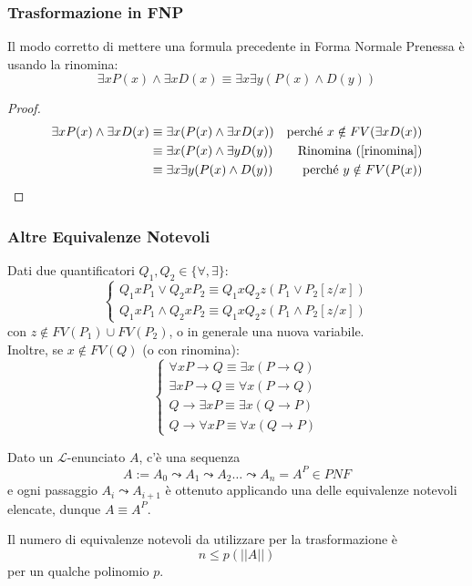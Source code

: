 \subsubsection{Trasformazione in FNP}
Il modo corretto di mettere una formula precedente in Forma Normale Prenessa è usando la rinomina:
$$
\exists x P(x) \land \exists x D(x) \equiv \exists x \exists y (P(x) \land D(y))
$$
\begin{proof}
\begin{align*}
  \exists x P(x) \land \exists x D(x) & \equiv \exists x (P(x) \land \exists x D(x)) & \text{perché } x \notin FV(\exists x D(x)) \\
  & \equiv \exists x (P(x) \land \exists y D(y)) & \text{Rinomina~(\ref{rinomina})} \\
  & \equiv \exists x \exists y (P(x) \land D(y)) & \text{perché } y \notin FV(P(x)) \\
\end{align*}
\end{proof}

\subsubsection{Altre Equivalenze Notevoli}
Dati due quantificatori $Q_1, Q_2 \in \{\forall, \exists\}$:
\[
\begin{cases}
  Q_1 x P_1 \lor Q_2 x P_2 \equiv Q_1 x Q_2 z (P_1 \lor P_2[z/x]) \\
  Q_1 x P_1 \land Q_2 x P_2 \equiv Q_1 x Q_2 z (P_1 \land P_2[z/x])
\end{cases}
\]
con $z \notin FV(P_1) \cup FV(P_2)$, o in generale una nuova variabile. \\
Inoltre, se $x \notin FV(Q)$ (o con rinomina): 
$$
\begin{cases}
  \forall x P \rightarrow Q \equiv \exists x (P \rightarrow Q) \\
  \exists x P \rightarrow Q \equiv \forall x (P \rightarrow Q) \\
  Q \rightarrow \exists x P  \equiv \exists x (Q \rightarrow P) \\
  Q \rightarrow \forall x P  \equiv \forall x (Q \rightarrow P)
\end{cases}
$$

\noindent
Dato un $\mathscr{L}$-enunciato $A$, c'è una sequenza
$$
A := A_0 \leadsto A_1 \leadsto A_2 \ldots \leadsto A_n = A^P \in PNF
$$
e ogni passaggio  $A_i \leadsto A_{i+1}$ è ottenuto applicando una delle equivalenze 
notevoli elencate, dunque $A \equiv A^P$. 
\begin{oss}
        Il numero di equivalenze notevoli da utilizzare per la trasformazione è 
        $$
        n \leq p(||A||)
        $$
        per un qualche polinomio $p$. 
\end{oss}

